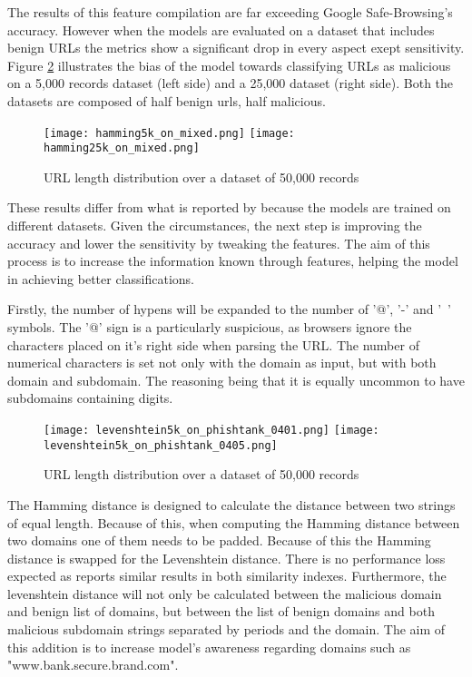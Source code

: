 The results of this feature compilation are far exceeding Google Safe-Browsing's accuracy. However when the models are evaluated on a dataset that includes benign URLs the metrics show a significant drop in every aspect exept sensitivity. Figure \ref{fig:HAMMING_ON_MIXED} illustrates the bias of the model towards classifying URLs as malicious on a 5,000 records dataset (left side) and a 25,000 dataset (right side). Both the datasets are composed of half benign urls, half malicious.

\begin{figure}[b]
	\centering
	\texttt{[image: hamming5k\_on\_mixed.png]}	\texttt{[image: hamming25k\_on\_mixed.png]}
	\caption{URL length distribution over a dataset of 50,000 records}
	\label{fig:HAMMING_ON_MIXED}
\end{figure}

These results differ from what is reported by \cite{SVM_SIMILARITY_INDEX} because the models are trained on different datasets. Given the circumstances, the next step is improving the accuracy and lower the sensitivity by tweaking the features. The aim of this process is to increase the information known through features, helping the model in achieving better classifications.

Firstly, the number of hypens will be expanded to the number of '@', '-' and '~' symbols. The '@' sign is a particularly suspicious, as browsers ignore the characters placed on it's right side when parsing the URL. The number of numerical characters is set not only with the domain as input, but with both domain and subdomain. The reasoning being that it is equally uncommon to have subdomains containing digits.

\begin{figure}[t]
	\centering
	\texttt{[image: levenshtein5k\_on\_phishtank\_0401.png]}	\texttt{[image: levenshtein5k\_on\_phishtank\_0405.png]}
	\caption{URL length distribution over a dataset of 50,000 records}
	\label{fig:HAMMING_ON_MIXED}
\end{figure}

The Hamming distance is designed to calculate the distance between two strings of equal length. Because of this, when computing the Hamming distance between two domains one of them needs to be padded. Because of this the Hamming distance is swapped for the Levenshtein distance. There is no performance loss expected as \cite{SVM_SIMILARITY_INDEX} reports similar results in both similarity indexes. Furthermore, the levenshtein distance will not only be calculated between the malicious domain and benign list of domains, but between the list of benign domains and both malicious subdomain strings separated by periods and the domain. The aim of this addition is to increase model's awareness regarding domains such as "www.bank.secure.brand.com".

